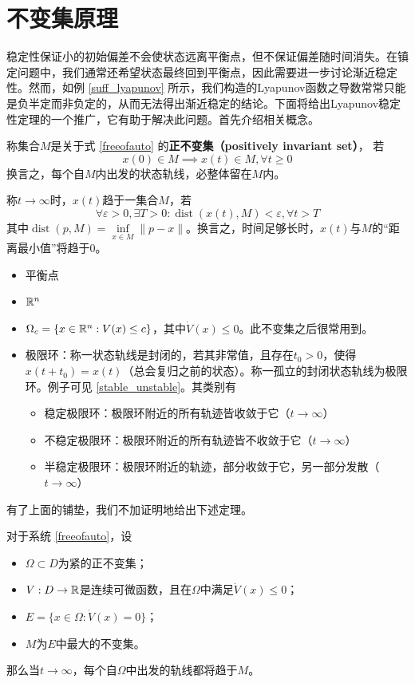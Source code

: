 \section{不变集原理}\label{2Dref}
稳定性保证小的初始偏差不会使状态远离平衡点，但不保证偏差随时间消失。在镇定问题中，我们通常还希望状态最终回到平衡点，因此需要进一步讨论渐近稳定性。然而，如例 \ref{suff_lyapunov} 所示，我们构造的Lyapunov函数之导数常常只能是负半定而非负定的，从而无法得出渐近稳定的结论。下面将给出Lyapunov稳定性定理的一个推广，它有助于解决此问题。首先介绍相关概念。
\begin{definition}
	称集合$M$是关于式 \eqref{freeofauto} 的{\bf 正不变集（positively invariant set）}，
	若\[x(0)\in M\implies x(t)\in M,\forall t\ge0\]
	换言之，每个自$M$内出发的状态轨线，必整体留在$M$内。
\end{definition}
\begin{definition}
	称$t\to\infty$时，$x(t)$趋于一集合$M$，若\[\forall \varepsilon>0,\exists T>0:\operatorname{dist}(x(t),M)<\varepsilon,\forall t>T\]
	其中$\operatorname{dist}(p,M)=\inf\limits_{x\in M}\|p-x\|$。换言之，时间足够长时，$x(t)$与$M$的“距离最小值”将趋于0。
\end{definition}
\begin{example}[不变集]\label{invset}
	\begin{itemize}[leftmargin=1em]
		\item 平衡点
		\item $\mathbb{R}{}^n$
		\item $\Omega_c=\{x\in\mathbb{R}{}^n:V(x)\le c\}$，其中$\dot{V}(x)\le 0$。此不变集之后很常用到。
		\item 极限环：称一状态轨线是封闭的，若其非常值，且存在$t_0>0$，使得$x(t+t_0)=x(t)$（总会复归之前的状态）。称一孤立的封闭状态轨线为极限环。例子可见 \ref{stable_unstable}。其类别有
		\begin{itemize}[leftmargin=1em]
			\item 稳定极限环：极限环附近的所有轨迹皆收敛于它（$t\to\infty$）
			\item 不稳定极限环：极限环附近的所有轨迹皆不收敛于它（$t\to\infty$）
			\item 半稳定极限环：极限环附近的轨迹，部分收敛于它，另一部分发散（$t\to\infty$）
		\end{itemize}
	\end{itemize}
\end{example}
有了上面的铺垫，我们不加证明地给出下述定理。
\begin{theorem}[LaSalle不变集原理]\label{lasalle}
	对于系统 \eqref{freeofauto}，设\begin{itemize}[leftmargin=1em]
		\item $\Omega\subset D$为紧的正不变集；
		\item $V:D\to\mathbb{R}{}$是连续可微函数，且在$\Omega$中满足$\dot{V}(x)\le 0$；
		\item $E=\{x\in\Omega: \dot{V}(x)= 0\}$；
		\item $M$为$E$中最大的不变集。
	\end{itemize}
	那么当$t\to\infty$，每个自$\Omega$中出发的轨线都将趋于$M$。
\end{theorem}
